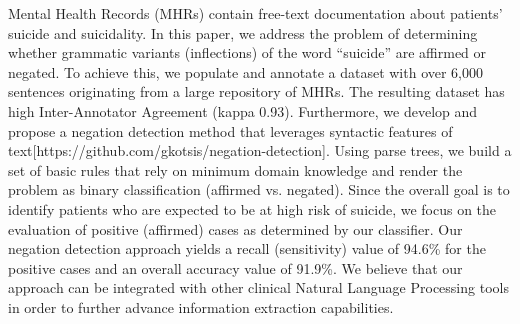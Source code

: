 Mental Health Records (MHRs) contain free-text documentation about patients' suicide and suicidality. In this paper, we address the problem of determining whether grammatic variants (inflections) of the word ``suicide'' are affirmed or negated. To achieve this, we populate and annotate a dataset with over 6,000 sentences originating from a large repository of MHRs. The resulting dataset has high Inter-Annotator Agreement (kappa 0.93). Furthermore, we develop and propose a negation detection method that leverages syntactic features of text[https://github.com/gkotsis/negation-detection]. Using parse trees, we build a set of basic rules that rely on minimum domain knowledge and render the problem as binary classification (affirmed vs. negated). Since the overall goal is to identify patients who are expected to be at high risk of suicide, we focus on the evaluation of positive (affirmed) cases as determined by our classifier. Our negation detection approach yields a recall (sensitivity) value of 94.6\% for the positive cases and an overall accuracy value of 91.9\%. We believe that our approach can be integrated with other clinical Natural Language Processing tools in order to further advance information extraction capabilities.
